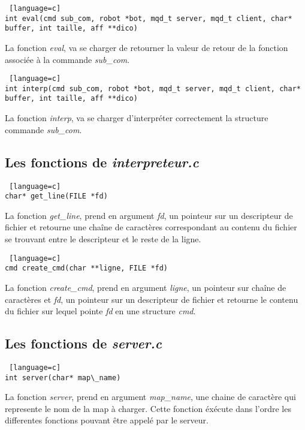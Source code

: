 \documentclass[a4paper, 11pt]{article}
\begin{document}
\begin {lstlisting} [language=c]
int eval(cmd sub_com, robot *bot, mqd_t server, mqd_t client, char* buffer, int taille, aff **dico)
\end{lstlisting}
La fonction \emph{eval}, va se charger de retourner la valeur de retour de la fonction associée à la commande \emph{sub\_com}.\\

\begin {lstlisting} [language=c]
int interp(cmd sub_com, robot *bot, mqd_t server, mqd_t client, char* buffer, int taille, aff **dico)
\end{lstlisting}
La fonction \emph{interp}, va se charger d'interpréter correctement la structure commande \emph{sub\_com}.\\

\subsection{Les fonctions de \emph{interpreteur.c}}
\begin {lstlisting} [language=c]
char* get_line(FILE *fd)
\end{lstlisting}
La fonction \emph{get\_line}, prend en argument \emph{fd}, un pointeur sur un descripteur de fichier et retourne une chaîne de caractères correspondant au contenu du fichier se trouvant entre le descripteur et le reste de la ligne.\\

\begin {lstlisting} [language=c]
cmd create_cmd(char **ligne, FILE *fd)
\end{lstlisting}
La fonction \emph{create\_cmd}, prend en argument \emph{ligne}, un pointeur sur chaîne de caractères et \emph{fd}, un pointeur sur un descripteur de fichier et retourne le contenu du fichier sur lequel pointe \emph{fd} en une structure \emph{cmd}.\\

\newpage
\subsection{Les fonctions de \emph{server.c}}
\begin {lstlisting} [language=c]
int server(char* map\_name)
\end{lstlisting}
La fonction \emph{server}, prend en argument \emph{map\_name}, une chaine de caractère qui represente le nom de la map à charger. Cette
fonction éxécute dans l'ordre les differentes fonctions pouvant être appelé par le serveur.\\
\end{document}
